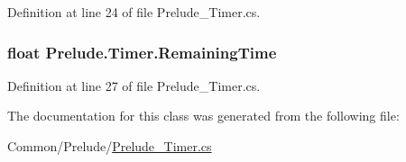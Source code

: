 Definition at line 24 of file Prelude\+\_\+\+Timer.\+cs.

\hypertarget{class_prelude_1_1_timer_ae7ff791e4ec2c4e9ad4b5636263804fe}{
\subsubsection[{Remaining\+Time}]{\setlength{\rightskip}{0pt plus 5cm}float Prelude.\+Timer.\+Remaining\+Time\hspace{0.3cm}{\ttfamily [get]}}}\label{class_prelude_1_1_timer_ae7ff791e4ec2c4e9ad4b5636263804fe}


Definition at line 27 of file Prelude\+\_\+\+Timer.\+cs.



The documentation for this class was generated from the following file\+:\begin{DoxyCompactItemize}
\item 
Common/\+Prelude/\hyperlink{_prelude___timer_8cs}{Prelude\+\_\+\+Timer.\+cs}\end{DoxyCompactItemize}
